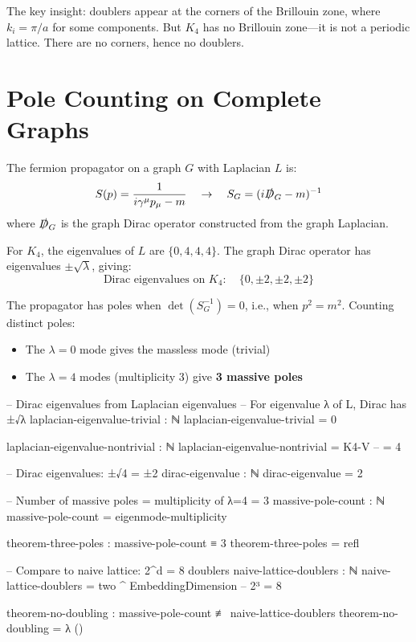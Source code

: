 \documentclass[11pt,a4paper]{book}
\begin{document}
The key insight: doublers appear at the corners of the Brillouin zone, where $k_i = \pi/a$ for some components. But $K_4$ has no Brillouin zone---it is not a periodic lattice. There are no corners, hence no doublers.

\section{Pole Counting on Complete Graphs}

The fermion propagator on a graph $G$ with Laplacian $L$ is:
\[
S(p) = \frac{1}{i\gamma^\mu p_\mu - m} \quad \to \quad S_G = (i\slashed{D}_G - m)^{-1}
\]
where $\slashed{D}_G$ is the graph Dirac operator constructed from the graph Laplacian.

For $K_4$, the eigenvalues of $L$ are $\{0, 4, 4, 4\}$. The graph Dirac operator has eigenvalues $\pm\sqrt{\lambda}$, giving:
\[
\text{Dirac eigenvalues on } K_4: \quad \{0, \pm 2, \pm 2, \pm 2\}
\]

The propagator has poles when $\det(S_G^{-1}) = 0$, i.e., when $p^2 = m^2$. Counting distinct poles:
\begin{itemize}
\item The $\lambda = 0$ mode gives the massless mode (trivial)
\item The $\lambda = 4$ modes (multiplicity 3) give \textbf{3 massive poles}
\end{itemize}

\begin{code}
-- Dirac eigenvalues from Laplacian eigenvalues
-- For eigenvalue λ of L, Dirac has ±√λ
laplacian-eigenvalue-trivial : ℕ
laplacian-eigenvalue-trivial = 0

laplacian-eigenvalue-nontrivial : ℕ
laplacian-eigenvalue-nontrivial = K4-V  -- = 4

-- Dirac eigenvalues: ±√4 = ±2
dirac-eigenvalue : ℕ
dirac-eigenvalue = 2

-- Number of massive poles = multiplicity of λ=4 = 3
massive-pole-count : ℕ
massive-pole-count = eigenmode-multiplicity

theorem-three-poles : massive-pole-count ≡ 3
theorem-three-poles = refl

-- Compare to naive lattice: 2^d = 8 doublers
naive-lattice-doublers : ℕ
naive-lattice-doublers = two ^ EmbeddingDimension  -- 2³ = 8

theorem-no-doubling : massive-pole-count ≢ naive-lattice-doublers
theorem-no-doubling = λ ()
\end{code}
\end{document}
